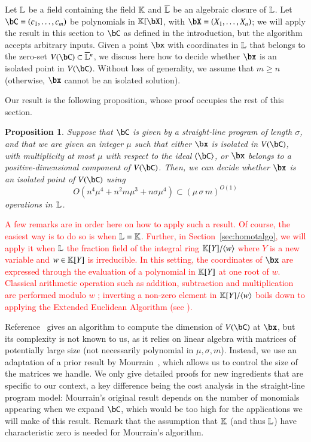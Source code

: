 \documentclass[amsthm]{elsart}
\newtheorem{proposition}[definition]{Proposition}
\begin{document}
Let $\mathbb{L}$ be a field containing the field $\mathbb{K}$ and $\overline{\mathbb{L}}$ be an
algebraic closure of $\mathbb{L}$.  Let $\bC=(c_1,\dots,c_m)$ be polynomials
in $\KK[\bX]$, with $\bX=(X_1,\dots,X_n)$; we will apply the result in
this section to $\bC$ as defined in the introduction, but the
algorithm accepts arbitrary inputs. Given a point $\bx$ with
coordinates in $\mathbb{L}$ that belongs to the zero-set $V(\bC)\subset
\LLbar{}^n$, we discuss here how to decide whether $\bx$ is an
isolated point in $V(\bC)$.  Without loss of generality, we assume
that $m\ge n$ (otherwise, $\bx$ cannot be an isolated solution).

Our result is the following proposition, whose proof occupies the rest
of this section.
\begin{proposition}\label{prop:testisolated}
  Suppose that $\bC$ is given by a straight-line program of length
  $\sigma$, and that we are given an integer $\mu$ such that
  either $\bx$ is isolated in $V(\bC)$, with multiplicity at most
  $\mu$ with respect to the ideal $\langle \bC\rangle$, or $\bx$
  belongs to a positive-dimensional component of $V(\bC)$.
  Then, we can decide whether $\bx$ is an isolated point of $V(\bC)$
  using
$$O(n^4 \mu^4 + n^2 m \mu^3 + n \sigma \mu^4) \subset (\mu\,\sigma\,m)^{O(1)}$$ operations in~$\mathbb{L}$.
\end{proposition}
\textcolor{red}{A few remarks are in order here on how to apply such a result.
  Of course, the easiest way is to do so is when $\mathbb{L}=\mathbb{K}$. Further, in
  Section~\ref{sec:homotalgo}, we will apply it when $\mathbb{L}$ the fraction field of
  the integral ring $\mathbb{K}[Y] / \langle w \rangle$ where $Y$ is a new variable and
  $w \in \mathbb{K}[Y]$ is irreducible. In this setting, the coordinates of $\bx$ are
  expressed through the evaluation of a polynomial in $\mathbb{K}[Y]$ at one root of
  $w$. Classical arithmetic operation such as addition, subtraction and
  multiplication are performed modulo $w$ ; inverting a non-zero element in
  $\mathbb{K}[Y] / \langle w \rangle$ boils down to applying the Extended Euclidean
  Algorithm (see \cite{GaGe03}). }


Reference~\cite{BaHaPeSo09} gives an algorithm to compute the
dimension of $V(\bC)$ at $\bx$, but its complexity is not known to us,
as it relies on linear algebra with matrices of potentially large size
(not necessarily polynomial in $\mu,\sigma,m$).  Instead, we use an
adaptation of a prior result by Mourrain~\cite{Mourrain97}, which
allows us to control the size of the matrices we handle. We only give
detailed proofs for new ingredients that are specific to our context,
a key difference being the cost analysis in the straight-line program
model: Mourrain's original result depends on the number of monomials
appearing when we expand $\bC$, which would be too high for the
applications we will make of this result. Remark that the assumption
that $\mathbb{K}$ (and thus $\mathbb{L}$) have characteristic zero is needed for 
Mourrain's algorithm.
\end{document}
